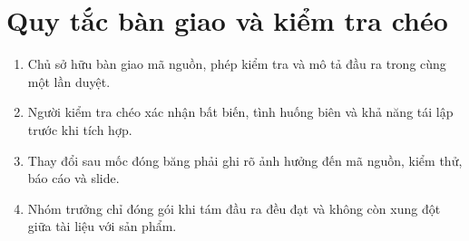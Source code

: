 \documentclass[12pt,a4paper,twoside,openright]{report}
\begin{document}
\section{Quy tắc bàn giao và kiểm tra chéo}
\begin{enumerate}
  \item Chủ sở hữu bàn giao mã nguồn, phép kiểm tra và mô tả đầu ra trong cùng một lần duyệt.
  \item Người kiểm tra chéo xác nhận bất biến, tình huống biên và khả năng tái lập trước khi tích hợp.
  \item Thay đổi sau mốc đóng băng phải ghi rõ ảnh hưởng đến mã nguồn, kiểm thử, báo cáo và slide.
  \item Nhóm trưởng chỉ đóng gói khi tám đầu ra đều đạt và không còn xung đột giữa tài liệu với sản phẩm.
\end{enumerate}
\end{document}
